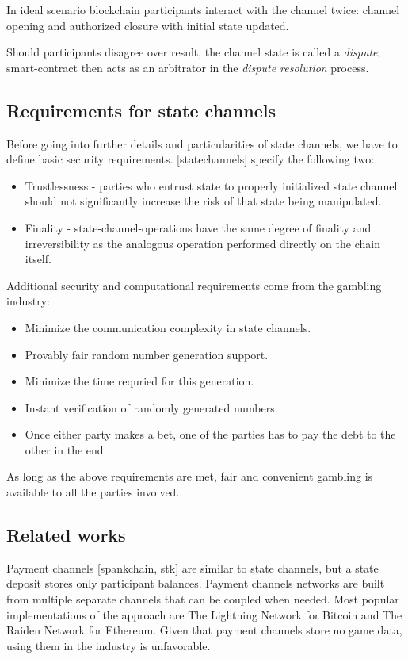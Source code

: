 	In ideal scenario blockchain participants interact with the channel twice: channel opening and authorized closure with initial state updated.

	Should participants disagree over result, the channel state is called a \textit {dispute}; smart-contract then acts as an arbitrator in the \textit {dispute resolution} process.

		\subsection {Requirements for state channels}
	Before going into further details and particularities of state channels, we have to define basic security requirements. [statechannels] specify the following two:
	\begin{itemize}
		\item Trustlessness - parties who entrust state to properly initialized state channel should not significantly increase the risk of that state being manipulated. 
		\item Finality - state-channel-operations have the same degree of finality and irreversibility as the analogous operation performed directly on the chain itself.
	\end{itemize}
	Additional security and computational requirements come from the gambling industry:
	\begin{itemize}
		\item Minimize the communication complexity in state channels.
		\item Provably fair random number generation support.
		\item Minimize the time requried for this generation.
		\item Instant verification of randomly generated numbers.
		\item Once either party makes a bet, one of the parties has to pay the debt to the other in the end. 
	\end{itemize}

	As long as the above requirements are met, fair and convenient gambling is available to all the parties involved.

		\subsection {Related works} 
	Payment channels [spankchain, stk] are similar to state channels, but a state deposit stores only participant balances. Payment channels networks are built from multiple separate channels that can be coupled when needed. Most popular implementations of the approach are The Lightning Network for Bitcoin and The Raiden Network for Ethereum. Given that payment channels store no game data, using them in the industry is unfavorable. 


